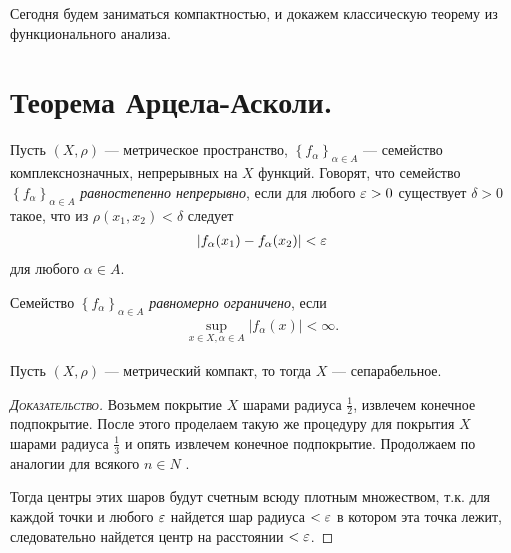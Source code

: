 \documentclass[../complex-analysis.tex]{subfiles}
\begin{document}
 Сегодня будем заниматься компактностью, и докажем классическую теорему из функционального анализа.

 \newpage
 \section{Теорема Арцела-Асколи.}

 \begin{df}
  Пусть $ (X,\rho) $ --- метрическое пространство, $ \left\{f_\alpha\right\}_{\alpha \in A}  $ --- семейство комплекснозначных, непрерывных на $ X $ функций. Говорят, что семейство $ \left\{f_\alpha\right\}_{\alpha\in A}  $ \textit{равностепенно непрерывно}, если для любого $ \varepsilon > 0 $ существует $ \delta > 0 $ такое, что из $ \rho(x_1, x_2) < \delta $ следует
  \begin{align}
	  \left|f_\alpha(x_1) - f_\alpha(x_2) \right| < \varepsilon \label{eq:equicontinuity}
  \end{align} для любого $ \alpha \in A $.
 \end{df}
 \begin{df}
  Семейство $ \left\{f_\alpha\right\}_{\alpha \in A}  $ \textit{равномерно ограничено}, если
  \begin{align*}
   \sup_{x \in X, \alpha \in A} \left| f_\alpha(x) \right| < \infty.
  \end{align*}
 \end{df}

 \begin{lm}
 	Пусть $(X, \rho)$ --- метрический компакт, то тогда $X$ --- сепарабельное.
 \end{lm}

 \begin{proof}[\normalfont\textsc{Доказательство}]
	 Возьмем покрытие $X$ шарами радиуса $\frac{1}{2}$, извлечем конечное подпокрытие.
	 После этого проделаем такую же процедуру для покрытия $X$ шарами радиуса $\frac{1}{3}$  и опять извлечем конечное подпокрытие.
	 Продолжаем по аналогии для всякого $n \in N$ .

	 Тогда центры этих шаров будут счетным всюду плотным множеством, т.к. для каждой точки и любого $\varepsilon$ найдется шар радиуса $< \varepsilon$ в котором эта точка лежит, следовательно найдется центр на расстоянии $< \varepsilon$. 
 \end{proof}
\end{document}
